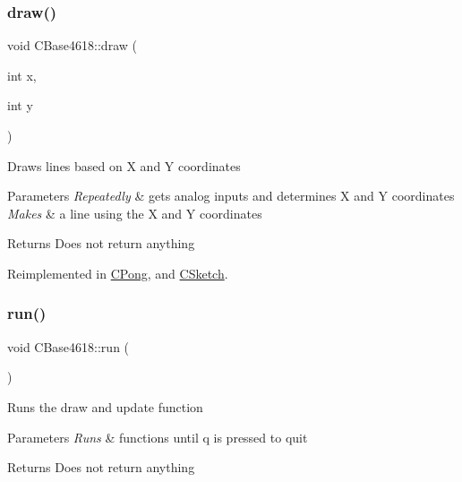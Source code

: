 \subsubsection{\texorpdfstring{draw()}{draw()}}
{\footnotesize\ttfamily void C\+Base4618\+::draw (\begin{DoxyParamCaption}\item[{int}]{x,  }\item[{int}]{y }\end{DoxyParamCaption})\hspace{0.3cm}{\ttfamily [virtual]}}

Draws lines based on X and Y coordinates


\begin{DoxyParams}{Parameters}
{\em Repeatedly} & gets analog inputs and determines X and Y coordinates \\
\hline
{\em Makes} & a line using the X and Y coordinates\\
\hline
\end{DoxyParams}
\begin{DoxyReturn}{Returns}
Does not return anything 
\end{DoxyReturn}


Reimplemented in \hyperlink{class_c_pong_ac4687aab31fbe5912cac2058663163fa}{C\+Pong}, and \hyperlink{class_c_sketch_a9b5af655812ecfa15791f5199854a3a4}{C\+Sketch}.

\hypertarget{class_c_base4618_a535e816d735d10d6048dd39cd893d393}{}\label{class_c_base4618_a535e816d735d10d6048dd39cd893d393} 
\subsubsection{\texorpdfstring{run()}{run()}}
{\footnotesize\ttfamily void C\+Base4618\+::run (\begin{DoxyParamCaption}{ }\end{DoxyParamCaption})}

Runs the draw and update function


\begin{DoxyParams}{Parameters}
{\em Runs} & functions until q is pressed to quit\\
\hline
\end{DoxyParams}
\begin{DoxyReturn}{Returns}
Does not return anything 
\end{DoxyReturn}
\hypertarget{class_c_base4618_a46e2ad109d3c7c877d00cff9093736c7}{}\label{class_c_base4618_a46e2ad109d3c7c877d00cff9093736c7} 
